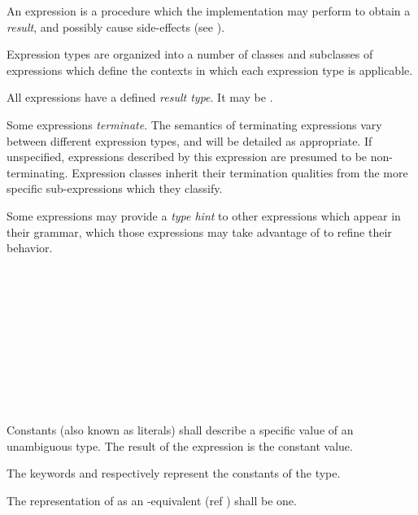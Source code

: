 
\specsubitem
An expression is a procedure which the implementation may perform to obtain a
\textit{result}, and possibly cause side-effects (see
).

\specsubitem
Expression types are organized into a number of classes and subclasses of
expressions which define the contexts in which each expression type is
applicable.

\specsubitem
All expressions have a defined \textit{result type}. It may be .

\specsubitem
Some expressions \textit{terminate}. The semantics of terminating expressions
vary between different expression types, and will be detailed as appropriate.
If unspecified, expressions described by this expression are presumed to be
non-terminating. Expression classes inherit their termination qualities from the
more specific sub-expressions which they classify.

\specsubitem
Some expressions may provide a \textit{type hint} to other expressions which
appear in their grammar, which those expressions may take advantage of to
refine their behavior.


\begin{grammar}
 \\
	 \\
	 \\
	 \\
	 \\
	 \\
	 \\
	 \\
	 \\
\end{grammar}

\specsubsubitem
Constants (also known as literals) shall describe a specific value of an
unambiguous type. The result of the expression is the constant value.

\specsubsubitem
The keywords  and  respectively represent
the constants of the  type.

\specsubsubitem
The representation of  as an -equivalent (ref
) shall be one.

